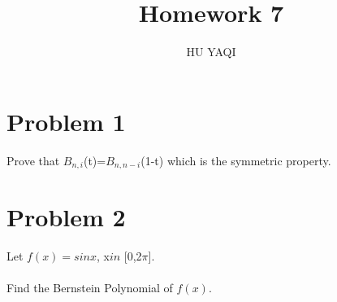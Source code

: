 \documentclass{article}
\title{ Homework 7 }
\author{HU YAQI}
\begin{document}
\maketitle
\setlength{\parindent}{0pt}

\section{ Problem 1 }
Prove that $B_{n,i}$(t)=$B_{n,n-i}$(1-t) which is the symmetric property.
\section{ Problem 2 }
Let $f(x)=sinx$,  x$in$ [0,2$\pi$].\\
\\
Find the Bernstein Polynomial of $f(x)$.
\end{document}
